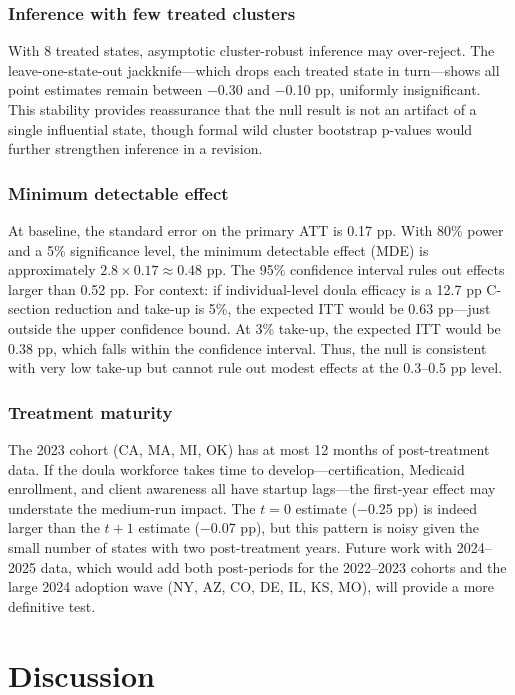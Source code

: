 \documentclass[12pt]{article}
\begin{document}
\subsubsection*{Inference with few treated clusters} With 8 treated states, asymptotic cluster-robust inference may over-reject. The leave-one-state-out jackknife---which drops each treated state in turn---shows all point estimates remain between $-$0.30 and $-$0.10 pp, uniformly insignificant. This stability provides reassurance that the null result is not an artifact of a single influential state, though formal wild cluster bootstrap p-values would further strengthen inference in a revision.

\subsubsection*{Minimum detectable effect} At baseline, the standard error on the primary ATT is 0.17 pp. With 80\% power and a 5\% significance level, the minimum detectable effect (MDE) is approximately $2.8 \times 0.17 \approx 0.48$ pp. The 95\% confidence interval rules out effects larger than 0.52 pp. For context: if individual-level doula efficacy is a 12.7 pp C-section reduction \citep{kozhimannil2013} and take-up is 5\%, the expected ITT would be 0.63 pp---just outside the upper confidence bound. At 3\% take-up, the expected ITT would be 0.38 pp, which falls within the confidence interval. Thus, the null is consistent with very low take-up but cannot rule out modest effects at the 0.3--0.5 pp level.

\subsubsection*{Treatment maturity} The 2023 cohort (CA, MA, MI, OK) has at most 12 months of post-treatment data. If the doula workforce takes time to develop---certification, Medicaid enrollment, and client awareness all have startup lags---the first-year effect may understate the medium-run impact. The $t=0$ estimate ($-$0.25 pp) is indeed larger than the $t+1$ estimate ($-$0.07 pp), but this pattern is noisy given the small number of states with two post-treatment years. Future work with 2024--2025 data, which would add both post-periods for the 2022--2023 cohorts and the large 2024 adoption wave (NY, AZ, CO, DE, IL, KS, MO), will provide a more definitive test.




\section{Discussion}
\end{document}
